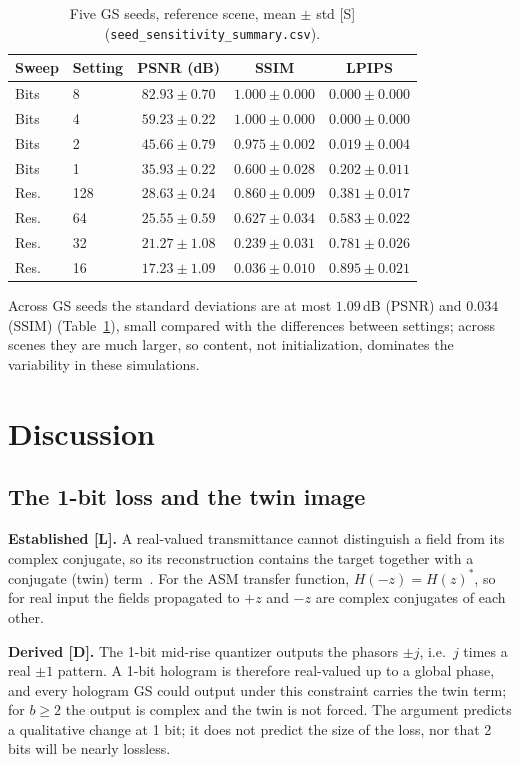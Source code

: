 \documentclass[conference]{IEEEtran}
\begin{document}
\begin{table}[t]
\centering
\caption{Five GS seeds, reference scene, mean $\pm$ std [S]
(\texttt{seed\_sensitivity\_summary.csv}).}
\label{tab:seed}
\begin{tabular}{llccc}
\toprule
Sweep & Setting & PSNR (dB) & SSIM & LPIPS \\
\midrule
Bits & 8 & $82.93 \pm 0.70$ & $1.000 \pm 0.000$ & $0.000 \pm 0.000$ \\
Bits & 4 & $59.23 \pm 0.22$ & $1.000 \pm 0.000$ & $0.000 \pm 0.000$ \\
Bits & 2 & $45.66 \pm 0.79$ & $0.975 \pm 0.002$ & $0.019 \pm 0.004$ \\
Bits & 1 & $35.93 \pm 0.22$ & $0.600 \pm 0.028$ & $0.202 \pm 0.011$ \\
Res. & 128 & $28.63 \pm 0.24$ & $0.860 \pm 0.009$ & $0.381 \pm 0.017$ \\
Res. & 64  & $25.55 \pm 0.59$ & $0.627 \pm 0.034$ & $0.583 \pm 0.022$ \\
Res. & 32  & $21.27 \pm 1.08$ & $0.239 \pm 0.031$ & $0.781 \pm 0.026$ \\
Res. & 16  & $17.23 \pm 1.09$ & $0.036 \pm 0.010$ & $0.895 \pm 0.021$ \\
\bottomrule
\end{tabular}
\end{table}
Across GS seeds the standard deviations are at most $1.09$\,dB (PSNR) and
$0.034$ (SSIM) (Table~\ref{tab:seed}), small compared with the differences
between settings; across scenes they are much larger, so content, not
initialization, dominates the variability in these simulations.

\section{Discussion}
\label{sec:discussion}
\subsection{The 1-bit loss and the twin image}
\textbf{Established [L].} A real-valued transmittance cannot distinguish a
field from its complex conjugate, so its reconstruction contains the target
together with a conjugate (twin) term~\cite{gabor1948new}. For the ASM
transfer function, $H(-z)=H(z)^*$, so for real input the fields propagated
to $+z$ and $-z$ are complex conjugates of each other.

\textbf{Derived [D].} The 1-bit mid-rise quantizer outputs the phasors
$\pm j$, i.e.\ $j$ times a real $\pm1$ pattern. A 1-bit hologram is therefore
real-valued up to a global phase, and every hologram GS could output under
this constraint carries the twin term; for $b\ge2$ the output is complex and
the twin is not forced. The argument predicts a qualitative change at 1 bit;
it does not predict the size of the loss, nor that 2 bits will be nearly
lossless.
\end{document}

